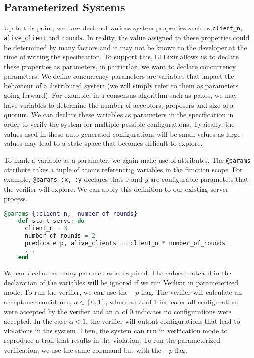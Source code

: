 \subsection{Parameterized Systems}
Up to this point, we have declared various system properties such as \texttt{client\_n}, \texttt{alive\_client} and \texttt{rounds}. In reality, the value assigned to these properties could be determined by many factors and it may not be known to the developer at the time of writing the specification. To support this, LTLixir allows us to declare these properties as parameters, in particular, we want to declare concurrency parameters. We define concurrency parameters are variables that impact the behaviour of a distributed system (we will simply refer to them as parameters going forward). For example, in a consensus algorithm such as paxos, we may have variables to determine the number of acceptors, proposers and size of a quorum. We can declare these variables as parameters in the specification in order to verify the system for multiple possible configurations. Typically, the values used in these auto-generated configurations will be small values as large values may lead to a state-space that becomes difficult to explore.
\par
To mark a variable as a parameter, we again make use of attributes. The \texttt{@params} attribute takes a tuple of atoms referencing variables in the function scope. For example, \texttt{@params {:x, :y}} declares that $x$ and $y$ are configurable parameters that the verifier will explore. We can apply this definition to our existing server process.
\begin{lstlisting}[language=Elixir, xleftmargin=.3\linewidth, caption={Example of declaring concurrency parameters in specification.}]
    @params {:client_n, :number_of_rounds}
    def start_server do
      client_n = 3
      number_of_rounds = 2
      predicate p, alive_clients == client_n * number_of_rounds
      ...
    end
\end{lstlisting}
We can declare as many parameters as required. The values matched in the declaration of the variables will be ignored if we run Verlixir in parameterized mode. To run the verifier, we can use the $-p$ flag. The verifier will calculate an acceptance confidence, \(\alpha \in [0, 1]\), where an $\alpha$ of 1 indicates all configurations were accepted by the verifier and an $\alpha$ of 0 indicates no configurations were accepted. In the case $\alpha < 1$, the verifier will output configurations that lead to violations in the system. Then, the system can run in verification mode to reproduce a trail that results in the violation. To run the parameterized verification, we use the same command but with the $-p$ flag.
